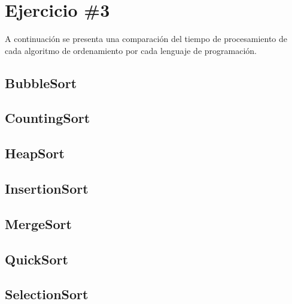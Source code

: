 \section*{Ejercicio \#3}
A continuación se presenta una comparación del tiempo de procesamiento de cada algoritmo de ordenamiento por cada lenguaje de programación.
\subsection*{BubbleSort}
\subsection*{CountingSort}
\subsection*{HeapSort}
\subsection*{InsertionSort}
\subsection*{MergeSort}
\subsection*{QuickSort}
\subsection*{SelectionSort}


